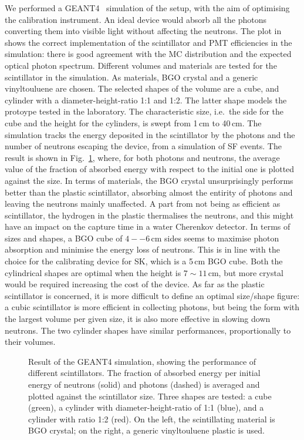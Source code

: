 We performed a GEANT4~\cite{Agostinelli:2002hh} simulation of the setup, with the aim of optimising the calibration instrument.
An ideal device would absorb all the photons converting them into visible light without affecting the neutrons.
The plot in  shows the correct implementation of the scintillator and PMT efficiencies in the simulation: %
there is good agreement with the MC distribution and the expected optical photon spectrum.
Different volumes and materials are tested for the scintillator in the simulation.
As materials, BGO crystal and a generic vinyltouluene are chosen.
The selected shapes of the volume are a cube, and cylinder with a diameter-height-ratio 1:1 and 1:2.
The latter shape models the protoype tested in the laboratory.
The characteristic size, i.e.\ the side for the cube and the height for the cylinders, is swept from 1\,cm to 40\,cm.
The simulation tracks the energy deposited in the scintillator by the photons and the number of neutrons escaping the device, %
from a simulation of  SF events.
The result is shown in Fig.~\ref{fig:geant4}, where, for both photons and neutrons, %
the average value of the fraction of absorbed energy with respect to the initial one is plotted against the size.
In terms of materials, the BGO crystal unsurprisingly performs better than the plastic scintillator, %
absorbing almost the entirity of photons and leaving the neutrons mainly unaffected.
A part from not being as efficient as scintillator, the hydrogen in the plastic thermalises the neutrons, %
and this might have an impact on the capture time in a water Cherenkov detector.
In terms of sizes and shapes, a BGO cube of $4--6$\,cm sides seems to maximise photon absorption and minimise %
the energy loss of neutrons.
This is in line with the choice for the calibrating device for SK, which is a 5\,cm BGO cube.
Both the cylindrical shapes are optimal when the height is $7\sim11$\,cm, but more crystal would be required %
increasing the cost of the device.
As far as the plastic scintillator is concerned, it is more difficult to define an optimal size/shape figure:
a cubic scintillator is more efficient in collecting photons, but being the form with the largest volume %
per given size, it is also more effective in slowing down neutrons.
The two cylinder shapes have similar performances, proportionally to their volumes.

\begin{figure}
	\centering
	\resizebox{0.9\textwidth}{!}{}
	\caption{Result of the GEANT4 simulation, showing the performance of different scintillators.
		The fraction of absorbed energy per initial energy of neutrons (solid) and photons (dashed) %
		is averaged and plotted against the scintillator size.
		Three shapes are tested: a cube (green), a cylinder with diameter-height-ratio of 1:1 (blue), %
		and a cylinder with ratio 1:2 (red).
		On the left, the scintillating material is BGO crystal; on the right, %
		a generic vinyltouluene plastic is used.}
	\label{fig:geant4}
\end{figure}


